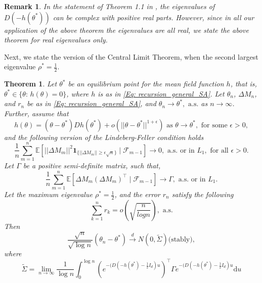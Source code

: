 \documentclass{article}
\numberwithin{equation}{section}
\newtheorem{theorem}{Theorem}[section]
\newtheorem{remark}{Remark}
\newcommand{\FF}{\mbox{${\mathcal F}$}}
\newcommand{\1}{\mathbf{1}}
\newcommand{\0}{\mathbf{0}}
\newcommand{\E}{\mbox{${\mathbb E}$}}
\begin{document}
\begin{remark}
In the statement of Theorem 1.1 in \cite{Zh_2016}, the eigenvalues of $D(-h(\theta^*))$ can be complex with positive real parts. However, since in all our application of the above theorem the eigenvalues are all real, we state the above theorem for real eigenvalues only. 
\end{remark}
Next, we state the version of the Central Limit Theorem, when the second largest eigenvalue $\rho^*= \frac{1}{2}$.
\begin{theorem}
\label{Thm: CLT_SA_for_rho_equals_1/2}
Let $\theta^*$ be an equilibrium point for the mean field function $h$, that is, $\theta^* \in \{\theta: \, h(\theta)=0\}$, where $h$ is as in \eqref{Eq: recursion_general_SA}. Let $\theta_n$, $\Delta M_n$, and $r_n$ be as in \eqref{Eq: recursion_general_SA}, and $\theta_n \longrightarrow \theta^*, \text{ a.s.}$ as $n \to \infty$. 
Further, assume that 
\begin{equation}
\label{Eq: Taylor_expnasion_for_theta}
h(\theta)= \left(\theta -\theta^*\right) Dh(\theta^*)+ o(\lvert \lvert \theta -\theta^*\rvert \rvert^{1+\epsilon}) \text{ as } \theta \rightarrow \theta^*, \text{ for some } \epsilon>0,
\end{equation}
and the following version of the Lindeberg-Feller condition holds
\begin{equation}
\label{Eq: Decay_martingale_difference_rho_half}
\frac{1}{n} \sum_{m=1}^n \E\left[\lvert \lvert \Delta M_m\rvert \rvert ^2 \mathbf{1}_{\{\lvert \lvert \Delta M_m\rvert \rvert \ge \epsilon \sqrt{n}\}}\mid  \FF_{m-1}\right] \longrightarrow 0, \text{ a.s. or in } L_1, \text{ for all } \epsilon>0.
\end{equation}
Let $\Gamma$ be a positive semi-definite matrix, such that,
\begin{equation}
\label{Eq: Gamma_as_limit}
\frac{1}{n} \sum_{m=1}^n \E \left[\Delta M_m \left(\Delta M_m\right)^\top \mid \FF_{m-1}\right]\rightarrow \Gamma, \text { a.s. or in } L_1. 
\end{equation}
Let the maximum eigenvalue $\rho^*=\frac{1}{2}$, and the error $r_n$ satisfy the following 
\begin{equation}
\label{Eq: sum_of_rn}
\sum_{k=1}^n r_k = o\left(\sqrt{\frac{n}{log n}}\right), \text{ a.s.}
\end{equation}
Then 
\begin{equation}
\label{Eq: CLT_rho_half}
\frac{\sqrt{n}}{\sqrt{\log n}} \left(\theta_n -\theta^*\right)\stackrel{d}{\longrightarrow} N\left(0, \widetilde{\Sigma}\right) \text{(stably)},
\end{equation}
where 
\begin{equation}
\label{Eq: Description_tilde_Sigma}
\widetilde{\Sigma}= \lim_{n \to \infty}\frac{1}{\log n}\int_{0}^{\log n} {\left(e^{-(D(-h(\theta^*)-\frac{1}{2}I_d) u}\right)^\top \Gamma e^{-(D(-h(\theta^*)-\frac{1}{2}I_d) u} \mathrm{d}u}
\end{equation}
\end{theorem}
\end{document}
